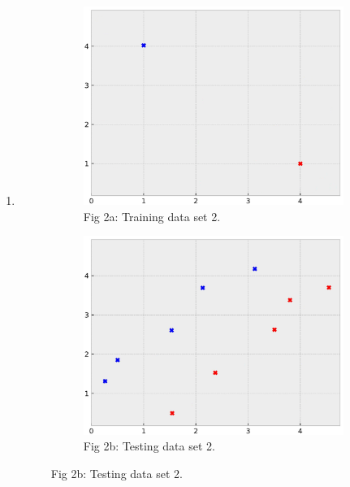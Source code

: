 \begin{enumerate}[font={\Large\bfseries},left=0pt]
\begin{Q}
\begin{enumerate}
             \item
              \begin{figure}[h]
                \centering
                \begin{subfigure}{0.49\columnwidth}
                \centering
                \includegraphics[width=0.85\columnwidth]{figures/training_new.png}
                \caption{Fig 2a: Training data set 2.}
                \label{fig: training 2}
                \end{subfigure}
                \begin{subfigure}{0.49\columnwidth}
                \centering
                \includegraphics[width=0.85\columnwidth]{figures/test_new.png}
                \caption{Fig 2b: Testing data set 2.}
                \label{fig: testing 2}
                \end{subfigure}
              \end{figure}


\end{enumerate}
\end{Q}
\end{enumerate}
